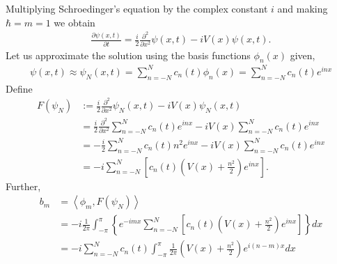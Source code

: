 \begin{questions}
\begin{solution}
Multiplying Schroedinger's equation by the complex constant $i$ and making $\hbar = m = 1$ we obtain
\begin{align*}
\frac{\partial\psi(x, t)}{\partial t}  = \frac{i}{2}\frac{\partial^2}{\partial x^2}\psi(x,t) - iV (x)\psi(x,t).
\end{align*}
Let us approximate the solution using the basis functions $\phi_n(x)$ given,
\begin{align*}
\psi(x,t)\approx\psi_N(x,t) = \sum_{n=-N}^Nc_n(t)\phi_n(x) = \sum_{n=-N}^Nc_n(t)e^{inx}
\end{align*}
Define 
\begin{align*}
F(\psi_N)&:= \frac{i}{2}\frac{\partial^2}{\partial x^2}\psi_N(x,t) - iV (x)\psi_N(x,t)\\
&= \frac{i}{2}\frac{\partial^2}{\partial x^2}\sum_{n=-N}^Nc_n(t)e^{inx} - iV (x)\sum_{n=-N}^Nc_n(t)e^{inx}\\
&= -\frac{i}{2}\sum_{n=-N}^Nc_n(t)n^2e^{inx} - iV (x)\sum_{n=-N}^Nc_n(t)e^{inx}\\
&= -i\sum_{n=-N}^N\left[c_n(t)\left(V (x) + \frac{n^2}{2}\right)e^{inx}\right].
\end{align*}
Further, 
\begin{align*}
b_m &= \left\langle \phi_m,F(\psi_N)\right\rangle\\
&= -i\frac{1}{2\pi}\int_{-\pi}^{\pi}\left\lbrace e^{-imx}\sum_{n=-N}^N\left[c_n(t)\left(V (x) + \frac{n^2}{2}\right)e^{inx}\right]\right\rbrace dx\\
&= -i\sum_{n=-N}^Nc_n(t)\int_{-\pi}^{\pi}\frac{1}{2\pi} \left(V (x) + \frac{n^2}{2}\right)e^{i(n-m)x} dx\\

\end{align*}
\end{solution}
\end{questions}
